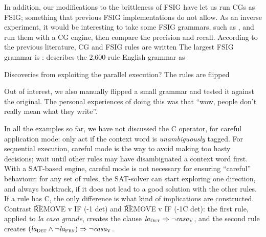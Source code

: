 In addition, our modifications to the brittleness of FSIG have let us run CGs as FSIG; something that previous FSIG implementations do not allow.
As an inverse experiment, it would be interesting to take some FSIG grammars, such as \cite{voutilainen1997fsig}, and run them with a CG engine, then compare the precision and recall. 
According to the previous literature, CG and FSIG rules are written 
The largest FSIG grammar is : \cite{voutilainen1998} describes the 2,600-rule English grammar as 




Discoveries from exploiting the parallel execution?
The rules are flipped

Out of interest, we also manually flipped a small grammar and tested it against the original.
The personal experiences of doing this was that ``wow, people don't really mean what they write''.

In all the examples so far, we have not discussed the C operator, for careful application mode:
only act if the context word is \emph{unambiguously} tagged.
For sequential execution, careful mode is the way to avoid making too hasty decisions; 
wait until other rules may have disambiguated a context word first.
With a SAT-based engine, careful mode is not necessary for ensuring ``careful'' behaviour: 
for any set of rules, the SAT-solver can start exploring one direction, 
and always backtrack, if it does not lead to a good solution with the other rules.
If a rule has C, the only difference is what kind of implications are constructed.
Contrast \t{REMOVE v IF (-1 det)} and \t{REMOVE v IF (-1C det)}: 
the first rule, applied to {\em la casa grande}, creates the clause 
$\text{\em la}_{\text{\sc Det}} \Rightarrow \neg \text{\em casa}_{\text{\sc V}}$, and the second rule creates
$(\text{\em la}_{\text{\sc Det}} \wedge \neg \text{\em la}_{\text{\sc Prn}}) \Rightarrow \neg \text{\em casa}_{\text{\sc V}}$.


